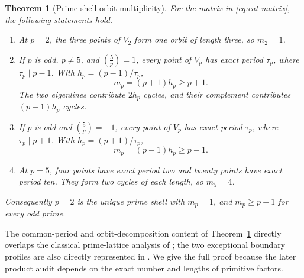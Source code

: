\documentclass[11pt]{article}
\newtheorem{theorem}{Theorem}[section]
\theoremstyle{definition}
\theoremstyle{remark}
\begin{document}
\begin{theorem}[Prime-shell orbit multiplicity]
\label{thm:prime-shell}
For the matrix in \eqref{eq:cat-matrix}, the following statements hold.
\begin{enumerate}
  \item At \(p=2\), the three points of \(V_2\) form one orbit of length
        three, so \(m_2=1\).
  \item If \(p\) is odd, \(p\ne5\), and
        \(\left(\frac5p\right)=1\), every point of \(V_p\) has exact
        period \(\tau_p\), where \(\tau_p\mid p-1\).  With
        \(h_p=(p-1)/\tau_p\),
        \begin{equation}
          m_p=(p+1)h_p\ge p+1.
          \label{eq:split-multiplicity}
        \end{equation}
        The two eigenlines contribute \(2h_p\) cycles, and their complement
        contributes \((p-1)h_p\) cycles.
  \item If \(p\) is odd and \(\left(\frac5p\right)=-1\), every point of
        \(V_p\) has exact period \(\tau_p\), where \(\tau_p\mid p+1\).
        With \(h_p=(p+1)/\tau_p\),
        \begin{equation}
          m_p=(p-1)h_p\ge p-1.
          \label{eq:inert-multiplicity}
        \end{equation}
  \item At \(p=5\), four points have exact period two and twenty points have
        exact period ten.  They form two cycles of each length, so \(m_5=4\).
\end{enumerate}
Consequently \(p=2\) is the unique prime shell with \(m_p=1\), and
\(m_p\ge p-1\) for every odd prime.
\end{theorem}

The common-period and orbit-decomposition content of
Theorem~\ref{thm:prime-shell} directly overlaps the classical prime-lattice
analysis of \citet{Gaspari1994}; the two exceptional boundary profiles are
also directly represented in \citet{BaakeNeumaerkerRoberts2013}.  We give
the full proof because the later product audit depends on the exact number
and lengths of primitive factors.
\end{document}
